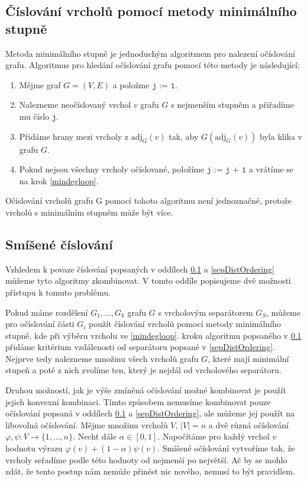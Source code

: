 \documentclass[11pt,american,czech,oneside]{book}
\theoremstyle{plain}
\theoremstyle{definition}
\begin{document}
\subsection{Číslování vrcholů pomocí metody minimálního stupně}
\label{MDordering}
Metoda minimálního stupně je jednoduchým algoritmem pro nalezení očíslování grafu. Algoritmus pro hledání očíslování grafu pomocí této metody je následující:

\begin{enumerate}
  \item Mějme graf $G=(V,E)$ a položme $\texttt{j := 1}$.
  \item \label{mindegloop}
      Nalezneme neočíslovaný vrchol $v$ grafu $G$ s nejmenším stupněm a přiřadíme mu číslo $\texttt{j}$.
  \item Přidáme hrany mezi vrcholy z $\mathrm{adj}_G(v)$ tak, aby $G(\mathrm{adj}_G(v))$ byla klika v grafu $G$.
  \item Pokud nejsou všechny vrcholy očíslované, položíme $\texttt{j := j + 1}$ a vrátíme se na krok \ref{mindegloop}.
\end{enumerate}

Očíslování vrcholů grafu G pomocí tohoto algoritmu není jednoznačné, protože vrcholů s minimálním stupněm může být více.

\subsection{Smíšené číslování}
\label{Mixedordering}
Vzhledem k povaze číslování popsaných v oddílech \ref{MDordering} a \ref{sepDistOrdering} můžeme tyto algoritmy zkombinovat. V tomto oddíle popisujeme dvě možnosti přístupu k tomuto problému.

Pokud máme rozdělení $G_1, \ldots, G_k$ grafu $G$ s vrcholovým separátorem $G_S$, můžeme pro očíslování části $G_i$ použít číslování vrcholů pomocí metody minimálního stupně, kde při výběru vrcholu ve \ref{mindegloop}. kroku algoritmu popsaného v \ref{MDordering} přidáme kritérium vzdálenosti od separátoru popsané v \ref{sepDistOrdering}. Nejprve tedy nalezneme množinu všech vrcholů grafu $G$, které mají minimální stupeň a poté z nich zvolíme ten, který je nejdál od vrcholového separátoru.

Druhou možností, jak je výše zmíněná očíslování možné kombinovat je použít jejich konvexní kombinaci. Tímto způsobem nemusíme kombinovat pouze očíslování popsaná v oddílech \ref{MDordering} a \ref{sepDistOrdering}, ale můžeme jej použít na libovolná očíslování. Mějme množinu vrcholů $V$, $|V|=n$ a dvě různá očíslování $\varphi,\psi :V \rightarrow \{1,\ldots,n\}$. Nechť dále $\alpha \in [0,1]$. Napočítáme pro každý vrchol $v$ hodnotu výrazu $\varphi(v) + (1-\alpha)\psi(v)$. Smíšené očíslování vytvoříme tak, že vrcholy seřadíme podle této hodnoty od nejmenší po největší. Ač by se mohlo zdát, že tento postup nám nemůže přinést nic nového, nemusí to být pravidlem\cite{slo:89,resc:99}.
\end{document}
